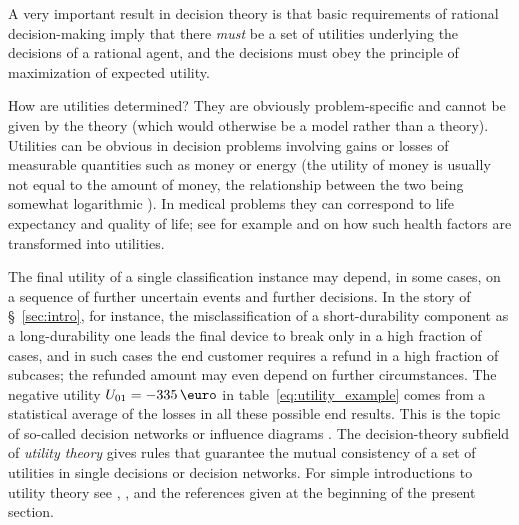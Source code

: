 \documentclass[\ifafour a4paper,12pt,\else a5paper,10pt,\fi%
onecolumn,oneside,article,%
british%
]{memoir}
\theoremstyle{remark}
\theoremstyle{innote}
\newcommand*{\p}{\mathrm{p}}%
\renewcommand*{\|}[1][]{\nonscript\:#1\vert\nonscript\:\mathopen{}}
\newcommand*{\sect}{\S}%
\newcommand*{\chap}{ch.}%
\newcommand*{\chaps}{chs}%
\newcommand*{\eg}{{e.g.}}
\newcommand*{\eu}{\bar{U}}
\begin{document}

A very important result in decision theory is that basic requirements of rational decision-making imply that there \emph{must} be a set of utilities underlying the decisions of a rational agent, and the decisions must obey the principle of maximization of expected utility\autocites[\sect~15.2]{russelletal1995_r2022}[\chaps~2--3]{neumannetal1944_r1955}.

How are utilities determined? They are obviously problem-specific and cannot be given by the theory (which would otherwise be a model rather than a theory). Utilities can be obvious in decision problems involving gains or losses of measurable quantities such as money or energy (the utility of money is usually not equal to the amount of money, the relationship between the two being somewhat logarithmic \autocites[\eg][pp.~203--204]{north1968}[\chap~4]{raiffa1968_r1970}). In medical problems they can correspond to life expectancy and quality of life; see for example \cite[esp. \chap~8 and \sect~11.2.9]{soxetal1988_r2013} and \cite[esp. \chap~4]{huninketal2001_r2014} on how such health factors are transformed into utilities.

The final utility of a single classification instance may depend, in some cases, on a sequence of further uncertain events and further decisions. In the story of \sect~\ref{sec:intro}, for instance, the misclassification of a short-durability component as a long-durability one leads the final device to break only in a high fraction of cases, and in such cases the end customer requires a refund in a high fraction of subcases; the refunded amount may even depend on further circumstances. The negative utility $U_{01} = -335\,\text{\texteuro}$ in table~\eqref{eq:utility_example} comes from a statistical average of the losses in all these possible end results. This is the topic of so-called decision networks or influence diagrams \autocites[Besides the general references already given:][\sect~15.5]{russelletal1995_r2022}{howardetal1984b_r2005}[for a step-by-step tutorial:][]{raiffa1968_r1970}. The decision-theory subfield of \emph{utility theory} gives rules that guarantee the mutual consistency of a set of utilities in single decisions or decision networks. For simple introductions to utility theory see \cite[\sect~15.2]{russelletal1995_r2022}, \cite[pp.~201--205]{north1968}, and the references given at the beginning of the present section.
\end{document}
